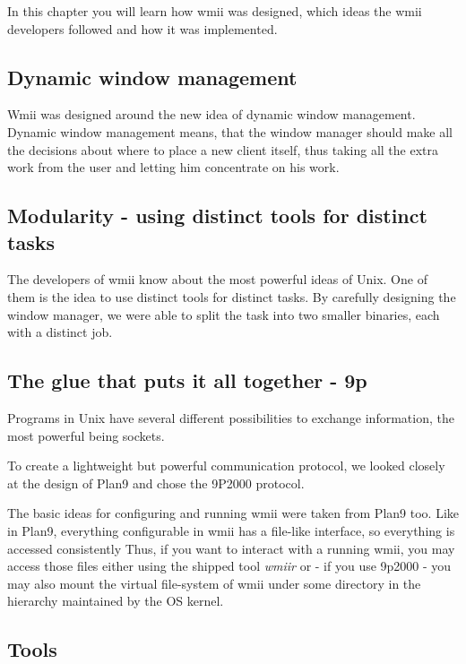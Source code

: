\documentclass[12pt,a4paper]{article} %
\begin{document}
  In this chapter you will learn how wmii was designed, which ideas
  the wmii developers followed and how it was implemented.

  \subsection{Dynamic window management}

    Wmii was designed around the new idea of dynamic window
    management. Dynamic window management means, that the window
    manager should make all the decisions about where to place a new
    client itself, thus taking all the extra work from the user and
    letting him concentrate on his work.

  \subsection{Modularity - using distinct tools for distinct tasks}

    The developers of wmii know about the most powerful ideas of
    Unix. One of them is the idea to use distinct tools for distinct
    tasks. By carefully designing the window manager, we were able to
    split the task into two smaller binaries, each with a distinct
    job.
  
  \subsection{The glue that puts it all together - 9p}

    Programs in Unix have several different possibilities to exchange
    information, the most powerful being sockets.

    To create a lightweight but powerful communication protocol, we
    looked closely at the design of Plan9 and chose the 9P2000
    protocol.

    The basic ideas for configuring and running wmii were taken from
    Plan9 too. Like in Plan9, everything configurable in wmii has a
    file-like interface, so everything is accessed consistently Thus,
    if you want to interact with a running wmii, you may access those
    files either using the shipped tool \emph{wmiir} or - if you use
    9p2000 - you may also mount the virtual file-system of wmii under
    some directory in the hierarchy maintained by the OS kernel.

  \subsection{Tools}
\end{document}
